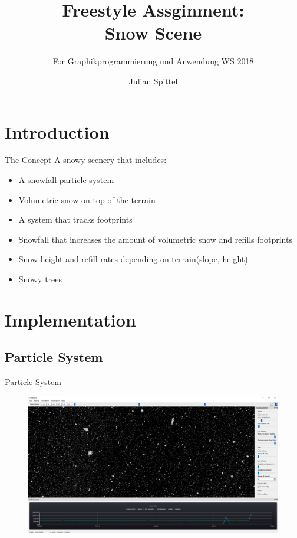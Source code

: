 \documentclass[18pt]{beamer}
\title[Snow Scene]{Freestyle Assginment:\\ Snow Scene}
\subtitle{For Graphikprogrammierung und Anwendung WS 2018}
\author{Julian Spittel}
\institute{Computer Graphics Group}
\begin{document}

\begin{frame}
\titlepage
\end{frame}

\section{Introduction}
\begin{frame}{The Concept}
A snowy scenery that includes:
\begin{itemize}
\item A snowfall particle system
\item Volumetric snow on top of the terrain
\item A system that tracks footprints
\item Snowfall that increases the amount of volumetric snow and refills footprints
\item Snow height and refill rates depending on terrain(slope, height)
\item Snowy trees
\end{itemize}
\end{frame}

\section{Implementation}


\subsection{Particle System}
\begin{frame}{Particle System}
	\begin{figure}[H]
		\centering
		\includegraphics[width=15cm]{images/Particles.PNG}
	\end{figure}
\end{frame}
\end{document}
